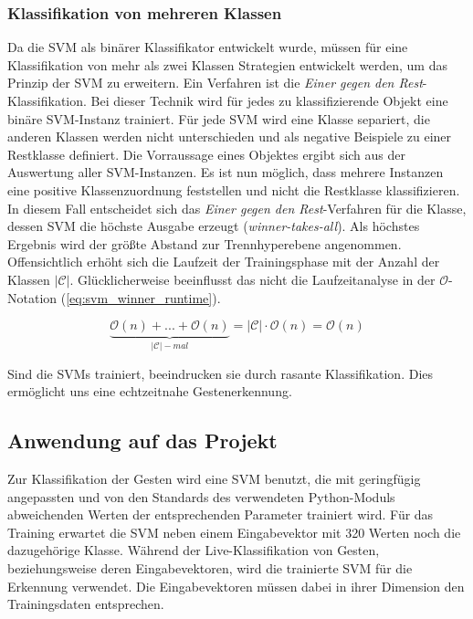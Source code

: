 \subsubsection{Klassifikation von mehreren Klassen}
Da die \ac{SVM} als binärer Klassifikator entwickelt wurde, müssen für eine Klassifikation von mehr als zwei Klassen Strategien entwickelt werden, um das Prinzip der \ac{SVM} zu erweitern. 
Ein Verfahren ist die \textit{Einer gegen den Rest}-Klassifikation. 
Bei dieser Technik wird für jedes zu klassifizierende Objekt eine binäre \ac{SVM}-Instanz trainiert. 
Für jede \ac{SVM} wird eine Klasse separiert, die anderen Klassen werden nicht unterschieden und als negative Beispiele zu einer Restklasse definiert. 
Die Vorraussage eines Objektes ergibt sich aus der Auswertung aller \ac{SVM}-Instanzen. 
Es ist nun möglich, dass mehrere Instanzen eine positive Klassenzuordnung feststellen und nicht die Restklasse klassifizieren. 
In diesem Fall entscheidet sich das \textit{Einer gegen den Rest}-Verfahren für die Klasse, dessen \ac{SVM} die höchste Ausgabe erzeugt (\textit{winner-takes-all}). 
Als höchstes Ergebnis wird der größte Abstand zur Trennhyperebene angenommen. 
Offensichtlich erhöht sich die Laufzeit der Trainingsphase mit der Anzahl der Klassen $|\mathcal{C}|$. 
Glücklicherweise beeinflusst das nicht die Laufzeitanalyse in der $\mathcal{O}$-Notation (\ref{eq:svm_winner_runtime}). 

\begin{equation}
\label{eq:svm_winner_runtime}
    \underbrace{\mathcal{O}(n) + ... + \mathcal{O}(n)}_{|\mathcal{C}|-mal} = |\mathcal{C}| \cdot \mathcal{O}(n) = \mathcal{O}(n)
\end{equation}

Sind die SVMs trainiert, beeindrucken sie durch rasante Klassifikation. 
Dies ermöglicht uns eine echtzeitnahe Gestenerkennung.



\subsection{Anwendung auf das Projekt}
Zur Klassifikation der Gesten wird eine \ac{SVM} benutzt, die mit geringfügig angepassten und von den Standards des verwendeten Python-Moduls abweichenden Werten der entsprechenden Parameter trainiert wird. 
Für das Training erwartet die \ac{SVM} neben einem Eingabevektor mit 320 Werten noch die dazugehörige Klasse.
Während der Live-Klassifikation von Gesten, beziehungsweise deren Eingabevektoren, wird die trainierte \ac{SVM} für die Erkennung verwendet.
Die Eingabevektoren müssen dabei in ihrer Dimension den Trainingsdaten entsprechen.


